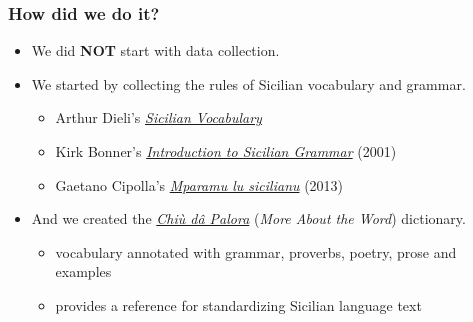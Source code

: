 \documentclass{beamer}
\begin{document}

\begin{frame}
  \frametitle{How did we do it?}
  \vspace{-1.0em}
  \begin{itemize}
  \item We did \textbf{NOT} start with data collection.
  \vspace{1em}
  \item We started by collecting the rules of Sicilian vocabulary and grammar.
    \begin{itemize}
    \item Arthur Dieli's \href{http://www.dieli.net/SicilyPage/SicilianLanguage/Vocabulary.html}{\textit{Sicilian Vocabulary}}
    \item Kirk Bonner's \href{http://www.arbasicula.org/LegasOnlineStore.html\#!/28-An-Introduction-to-Sicilian-Grammar-by-J-K-Kirk-Bonner-Edited-by-Gaetano-Cipolla/p/82865123/category=0}{\textit{Introduction to Sicilian Grammar}} (2001)
    \item Gaetano Cipolla's \href{http://www.arbasicula.org/LegasOnlineStore.html\#!/26-Learn-Sicilian-Mparamu-lu-sicilianu-by-Gaetano-Cipolla/p/82865121/category=0}{\textit{Mparamu lu sicilianu}} (2013)
    \end{itemize}
    \vspace{1em}
    \item And we created the \href{https://www.napizia.com/cgi-bin/cchiu-da-palora.pl}{\textit{Chiù dâ Palora}}
  (\textit{More About the Word}) dictionary.
    \begin{itemize}
    \item vocabulary annotated with grammar, proverbs, poetry, prose and examples
    \item provides a reference for standardizing Sicilian language text
    \end{itemize}
  \end{itemize}
\end{frame}

\end{document}
